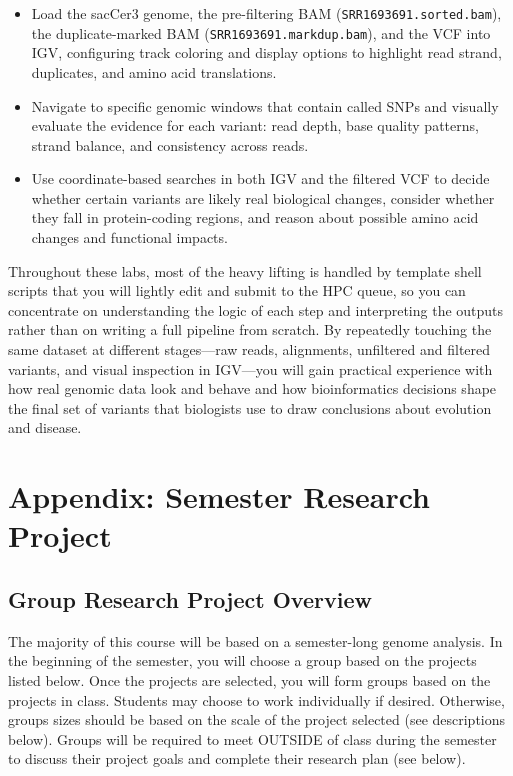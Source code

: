 \documentclass[
  letterpaper,
  DIV=11,
  numbers=noendperiod]{scrreprt}
\providecommand{\tightlist}{%
  \setlength{\itemsep}{0pt}\setlength{\parskip}{0pt}}
\begin{document}
\begin{itemize}
  \begin{itemize}
  \tightlist
  \item
    Load the sacCer3 genome, the pre-filtering BAM
    (\texttt{SRR1693691.sorted.bam}), the duplicate-marked BAM
    (\texttt{SRR1693691.markdup.bam}), and the VCF into IGV, configuring
    track coloring and display options to highlight read strand,
    duplicates, and amino acid translations.\\
  \item
    Navigate to specific genomic windows that contain called SNPs and
    visually evaluate the evidence for each variant: read depth, base
    quality patterns, strand balance, and consistency across reads.
  \item
    Use coordinate-based searches in both IGV and the filtered VCF to
    decide whether certain variants are likely real biological changes,
    consider whether they fall in protein-coding regions, and reason
    about possible amino acid changes and functional impacts.
  \end{itemize}
\end{itemize}

Throughout these labs, most of the heavy lifting is handled by template
shell scripts that you will lightly edit and submit to the HPC queue, so
you can concentrate on understanding the logic of each step and
interpreting the outputs rather than on writing a full pipeline from
scratch. By repeatedly touching the same dataset at different
stages---raw reads, alignments, unfiltered and filtered variants, and
visual inspection in IGV---you will gain practical experience with how
real genomic data look and behave and how bioinformatics decisions shape
the final set of variants that biologists use to draw conclusions about
evolution and disease.

\chapter{Appendix: Semester Research
Project}\label{appendix-semester-research-project}

\section{Group Research Project
Overview}\label{group-research-project-overview}

The majority of this course will be based on a semester-long genome
analysis. In the beginning of the semester, you will choose a group
based on the projects listed below. Once the projects are selected, you
will form groups based on the projects in class. Students may choose to
work individually if desired. Otherwise, groups sizes should be based on
the scale of the project selected (see descriptions below). Groups will
be required to meet OUTSIDE of class during the semester to discuss
their project goals and complete their research plan (see below).
\end{document}
